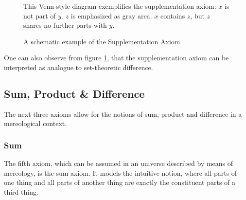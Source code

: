 \begin{figure}[h!]
\begin{center}
\end{center}
{
\scriptsize 
This Venn-style diagram exemplifies the supplementation axiom:
$x$ is not part of $y$.
$z$ is emphasized as gray area.
$x$ contains $z$, but $z$ shares no further parts with $y$.
}
\caption{A schematic example of the Supplementation Axiom}
\label{figure:SupplementaitonAxiomExample}
\end{figure}



One can also observe from figure \ref{figure:SupplementaitonAxiomExample}, that the supplementation axiom can be interpreted as analogue to set-theoretic difference.

\subsection{Sum, Product \& Difference}
\label{subsection:SumProductAndDifference}
The next three axioms allow for the notions of sum, product and difference in a mereological context.

\subsubsection{Sum}
The fifth axiom, which can be assumed in an universe described by means of mereology, is the sum axiom.
It models the intuitive notion, where all parts of one thing and all parts of another thing are exactly the constituent parts of a third thing.

